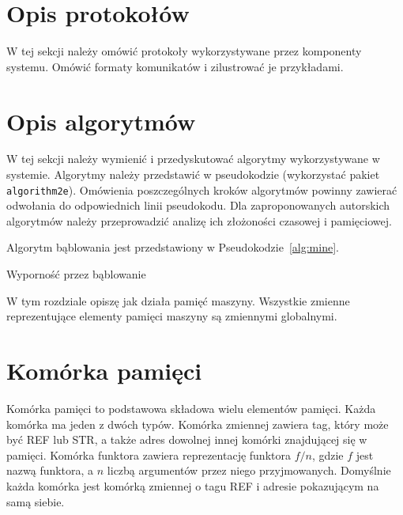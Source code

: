 \section{Opis protokołów}

W tej sekcji należy omówić protokoły wykorzystywane przez komponenty systemu. Omówić formaty komunikatów i zilustrować je przykładami. 

\section{Opis algorytmów}

W tej sekcji należy wymienić i przedyskutować algorytmy wykorzystywane w systemie. Algorytmy należy przedstawić w pseudokodzie (wykorzystać pakiet \texttt{algorithm2e}). Omówienia poszczególnych kroków algorytmów powinny zawierać odwołania do odpowiednich linii pseudokodu. Dla zaproponowanych autorskich algorytmów należy przeprowadzić analizę ich złożoności czasowej i pamięciowej. 

{\color{dgray}
Algorytm bąblowania jest przedstawiony w Pseudokodzie~\ref{alg:mine}.
}

{\small
\begin{pseudokod}[H]
\caption{Wyporność przez bąblowanie}\label{alg:mine}
\end{pseudokod}
}
\fi

W tym rozdziale opiszę jak działa pamięć maszyny. Wszystkie zmienne reprezentujące elementy pamięci maszyny są zmiennymi globalnymi.

\section{Komórka pamięci}

Komórka pamięci to podstawowa składowa wielu elementów pamięci. Każda komórka ma jeden z dwóch typów. Komórka zmiennej zawiera tag, który może być {REF} lub {STR}, a także adres dowolnej innej komórki znajdującej się w pamięci. Komórka funktora zawiera reprezentację funktora $f/n$, gdzie $f$ jest nazwą funktora, a $n$ liczbą argumentów przez niego przyjmowanych. Domyślnie każda komórka jest komórką zmiennej o tagu {REF} i adresie pokazującym na samą siebie.


